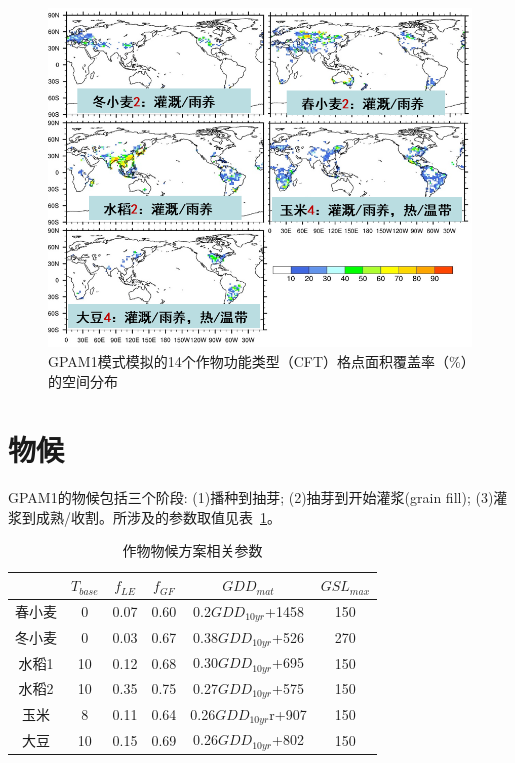 {
\begin{figure}[htbp]
\centering
\includegraphics[scale=0.9]{Figures/作物模式/GPAM1模式模拟的14个作物功能类型格点面积覆盖率空间分布.png}
\caption{GPAM1模式模拟的14个作物功能类型（CFT）格点面积覆盖率（\%）的空间分布}
\label{fig:作物功能类型覆盖率的空间分布}
\end{figure}
}

\section{物候}
GPAM1的物候包括三个阶段: (1)播种到抽芽; (2)抽芽到开始灌浆(grain fill); (3)灌浆到成熟/收割。所涉及的参数取值见表~\ref{tab:作物物候方案相关参数}。

\begin{table}[htbp]
  \centering
  \caption{作物物候方案相关参数}
  \label{tab:作物物候方案相关参数}
\begin{tabular}{@{}cccccc@{}}
\toprule
    & $T_{base}$ & $f_{LE}$  & $f_{GF}$  & $GDD_{mat}$          & $GSL_{max}$ \\ \midrule
春小麦 & 0     & 0.07 & 0.60 & 0.2$GDD_{10yr}$+1458 & 150    \\
冬小麦 & 0     & 0.03 & 0.67 & 0.38$GDD_{10yr}$+526 & 270    \\
水稻1 & 10    & 0.12 & 0.68 & 0.30$GDD_{10yr}$+695 & 150    \\
水稻2 & 10    & 0.35 & 0.75 & 0.27$GDD_{10yr}$+575 & 150    \\
玉米  & 8     & 0.11 & 0.64 & 0.26$GDD_{10yr}$r+907 & 150    \\
大豆  & 10    & 0.15 & 0.69 & 0.26$GDD_{10yr}$+802 & 150    \\ \bottomrule
\end{tabular}
\end{table}

